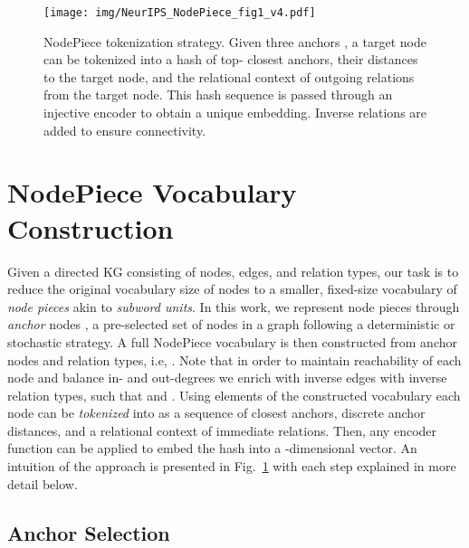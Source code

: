 \documentclass{article} \usepackage{iclr2022_conference,times}
\begin{document}
\begin{figure}[t]
    \centering
    \texttt{[image: img/NeurIPS\_NodePiece\_fig1\_v4.pdf]}
    \caption{NodePiece tokenization strategy. Given three anchors , a target node can be tokenized into a hash of top- closest anchors, their distances to the target node, and the relational context of outgoing relations from the target node. This hash sequence is passed through an injective encoder to obtain a unique embedding. Inverse relations are added to ensure connectivity.}
    \label{fig:app}
\end{figure}

\section{NodePiece Vocabulary Construction}

Given a directed KG  consisting of  nodes,  edges, and  relation types, our task is to reduce the original vocabulary size of  nodes to a smaller, fixed-size vocabulary of \emph{node pieces} akin to \emph{subword units}. 
In this work, we represent node pieces through \emph{anchor} nodes , a pre-selected set of nodes in a graph following a deterministic or stochastic strategy. 
A full NodePiece vocabulary is then constructed from anchor nodes and relation types, i.e, . 
Note that in order to maintain reachability of each node and balance in- and out-degrees we enrich  with inverse edges with inverse relation types, such that  and .
Using elements of the constructed vocabulary each node  can be \emph{tokenized} into  as a sequence of  closest anchors, discrete anchor distances, and a relational context of  immediate relations. 
Then, any encoder function  can be applied to embed the hash into a -dimensional vector.
An intuition of the approach is presented in Fig.~\ref{fig:app} with each step explained in more detail below. 


\subsection{Anchor Selection}
\label{sec:anchor_selection}
\end{document}
